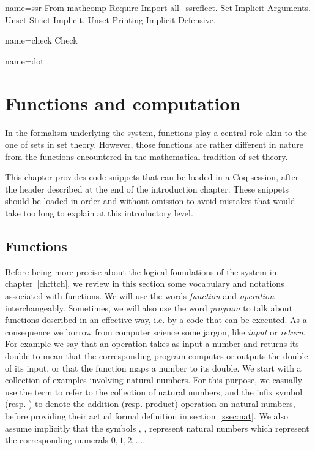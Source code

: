 \begin{coqdef}{name=ssr}
 From mathcomp Require Import all_ssreflect.
 Set Implicit Arguments.
 Unset Strict Implicit.
 Unset Printing Implicit Defensive.
\end{coqdef}
\begin{coqdef}{name=check}
Check
\end{coqdef}
\begin{coqdef}{name=dot}
.
\end{coqdef}

\chapter{Functions and computation}\label{ch:prog}

In the formalism underlying the \Coq{} system, functions play a
central role akin to the one of sets in set theory. However,
those functions are rather different in nature from the
functions encountered in the mathematical tradition of set theory.

This chapter provides code snippets that can be loaded in a Coq session,
after the header described at the end of the introduction chapter.
These snippets should be loaded in order and without
omission to avoid mistakes that would take too long to explain
at this introductory level.

\section{Functions}\label{sec:functions}
 Before being more
precise about the logical foundations of the \Coq{} system in
chapter~\ref{ch:ttch},
we review in this section some vocabulary and notations associated
with functions.
We will use the words \emph{function} and \emph{operation}
interchangeably. Sometimes, we will also use the word \emph{program}
to talk about functions described in an effective way, i.e. by a code
that can be executed. As a consequence we borrow from computer science
some jargon, like \emph{input} or \emph{return}. For example we say that
an operation takes as input a number and returns its double to mean
that the corresponding program computes or outputs the double of its
input, or that the function maps a number to its double. We start with
a collection of examples involving natural numbers. For this purpose,
we casually use the \Coq{} term  to refer to the collection of natural
numbers, and the infix symbol  \C{+} (resp. \C{*}) to denote the  addition
(resp. product) operation on natural numbers, before providing their
actual formal definition in section~\ref{ssec:nat}. We also
assume implicitly that the \Coq{} symbols  , , 
represent natural numbers which represent the corresponding numerals
$0, 1, 2, \dots$.


